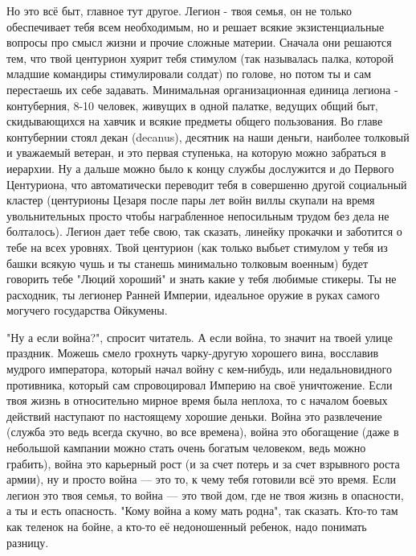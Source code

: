 Но это всё быт, главное тут другое. Легион - твоя семья, он не только обеспечивает тебя всем необходимым, но и решает всякие экзистенциальные вопросы про смысл жизни и прочие сложные материи. Сначала они решаются тем, что твой центурион хуярит тебя стимулом (так называлась палка, которой младшие командиры стимулировали солдат) по голове, но потом ты и сам перестаешь их себе задавать. Минимальная организационная единица легиона - контуберния, 8-10 человек, живущих в одной палатке, ведущих общий быт, скидывающихся на хавчик и всякие предметы общего пользования. Во главе контубернии стоял декан (decanus), десятник на наши деньги, наиболее толковый и уважаемый ветеран, и это первая ступенька, на которую можно забраться в иерархии. Ну а дальше можно было к концу службы дослужится и до Первого Центуриона, что автоматически переводит тебя в совершенно другой социальный кластер (центурионы Цезаря после пары лет войн виллы скупали на время увольнительных просто чтобы награбленное непосильным трудом без дела не болталось). Легион дает тебе свою, так сказать, линейку прокачки и заботится о тебе на всех уровнях. Твой центурион (как только выбьет стимулом у тебя из башки всякую чушь и ты станешь минимально толковым военным) будет говорить тебе "Люций хороший" и знать какие у тебя любимые стикеры. Ты не расходник, ты легионер Ранней Империи, идеальное оружие в руках самого могучего государства Ойкумены.


"Ну а если война?", спросит читатель. А если война, то значит на твоей улице праздник. Можешь смело грохнуть чарку-другую хорошего вина, восславив мудрого императора, который начал войну с кем-нибудь, или недальновидного противника, который сам спровоцировал Империю на своё уничтожение. Если твоя жизнь в относительно мирное время была неплоха, то с началом боевых действий наступают по настоящему хорошие деньки. Война это развлечение (служба это ведь всегда скучно, во все времена), война это обогащение (даже в небольшой кампании можно стать очень богатым человеком, ведь можно грабить), война это карьерный рост (и за счет потерь и за счет взрывного роста армии), ну и просто война — это то, к чему тебя готовили всё это время. Если легион это твоя семья, то война — это твой дом, где не твоя жизнь в опасности, а ты и есть опасность. "Кому война а кому мать родна", так сказать. Кто-то там как теленок на бойне, а кто-то её недоношенный ребенок, надо понимать разницу.


